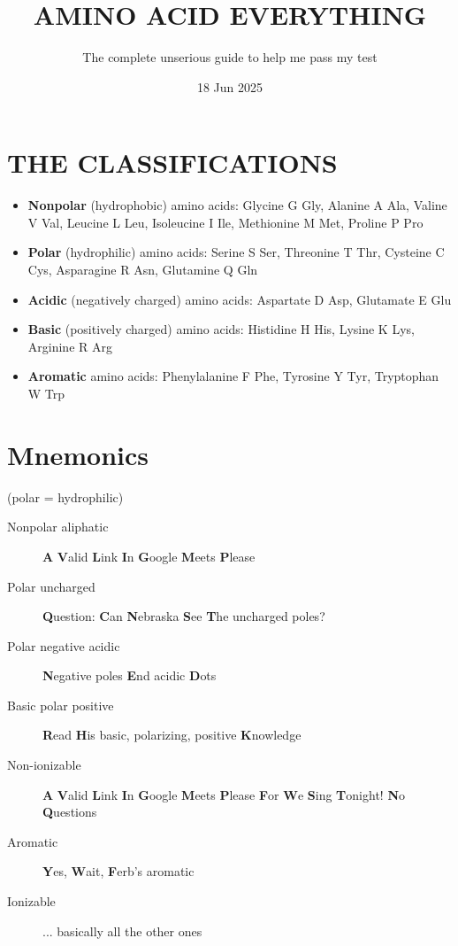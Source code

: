 \documentclass[letterpaper, 12pt]{article}
\title{AMINO ACID EVERYTHING}
\author{The complete unserious guide to help me pass my test}
\date{18 Jun 2025}
\begin{document}
\maketitle

\section*{THE CLASSIFICATIONS}

\begin{itemize}
    \item \textbf{Nonpolar} (hydrophobic) amino acids: Glycine G Gly, Alanine A Ala, Valine V Val, Leucine L Leu, Isoleucine I Ile, Methionine M Met, Proline P Pro
    \item \textbf{Polar} (hydrophilic) amino acids: Serine S Ser, Threonine T Thr, Cysteine C Cys, Asparagine R Asn, Glutamine Q Gln
    \item \textbf{Acidic} (negatively charged) amino acids: Aspartate D Asp, Glutamate E Glu
    \item \textbf{Basic} (positively charged) amino acids: Histidine H His, Lysine K Lys, Arginine R Arg
    \item \textbf{Aromatic} amino acids: Phenylalanine F Phe, Tyrosine Y Tyr, Tryptophan W Trp
\end{itemize}

\section*{Mnemonics}

(polar = hydrophilic)

\begin{description}
    \item[Nonpolar aliphatic] \textbf{A} \textbf{V}alid \textbf{L}ink \textbf{I}n \textbf{G}oogle \textbf{M}eets \textbf{P}lease
    \item [Polar uncharged] \textbf{Q}uestion: \textbf{C}an \textbf{N}ebraska \textbf{S}ee \textbf{T}he uncharged poles?
    \item [Polar negative acidic] \textbf{N}egative poles \textbf{E}nd acidic \textbf{D}ots
    \item [Basic polar positive] \textbf{R}ead \textbf{H}is basic, polarizing, positive \textbf{K}nowledge
    \item [Non-ionizable] \textbf{A} \textbf{V}alid \textbf{L}ink \textbf{I}n \textbf{G}oogle \textbf{M}eets \textbf{P}lease \textbf{F}or \textbf{W}e \textbf{S}ing \textbf{T}onight! \textbf{N}o \textbf{Q}uestions
    \item [Aromatic] \textbf{Y}es, \textbf{W}ait, \textbf{F}erb's aromatic
    \item [Ionizable] ... basically all the other ones
\end{description}
\end{document}
